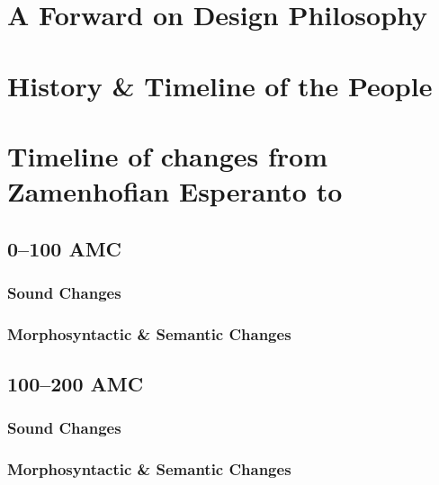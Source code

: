 \documentclass[a4paper,11pt,twoside,openany]{memoir}
\begin{document}
\begin{titlingpage}
\titleAM
\clearpage
\end{titlingpage}

\frontmatter

\tableofcontents

\chapter{A Forward on Design Philosophy}

\chapter{History \& Timeline of the \peoplegroup{} People}

\mainmatter
{}

\chapter{Timeline of changes from Zamenhofian Esperanto to \langname{}}

\section{0--100 AMC}

\subsection{Sound Changes}


\subsection{Morphosyntactic \& Semantic Changes}


\section{100--200 AMC}

\subsection{Sound Changes}


\subsection{Morphosyntactic \& Semantic Changes}

\end{document}
